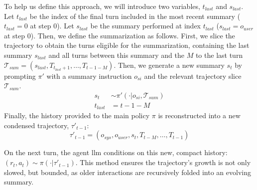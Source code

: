 \documentclass{article}
\begin{document}
To help us define this approach, we will introduce two variables, $t_{last}$ and $s_{last}$. Let $t_{last}$ be the index of the final turn included in the most recent summary ($t_{last}=0$ at step 0). Let $s_{last}$ be the summary performed at index $t_{last}$ ($s_{last}=o_{user}$ at step 0). Then, we define the summarization as follows. First, we slice the trajectory to obtain the turns eligible for the summarization, containing the last summary $s_{last}$ and all turns between this summary and the $M$ to the last turn $\mathcal{T}_{sum} = (s_{last}, T_{t_{last}+1}, \dots, T_{t-1-M})$. Then, we generate a new summary $s_t$ by prompting $\pi'$ with a summary instruction $o_{si}$ and the relevant trajectory slice $\mathcal{T}_{sum}$.
\begin{equation}
\begin{split}
s_{t} &\sim \pi'(\cdot|o_{si}, \mathcal{T}_{sum})\\
t_{last} &= t-1-M
\end{split}
\end{equation}
Finally, the history provided to the main policy $\pi$ is reconstructed into a new condensed trajectory, $\tau'_{t-1}$:
\begin{equation}
\label{eq:llm_summary_traj}
\tau'_{t-1} = (o_{sys}, o_{user}, s_t, T_{t-M}, \dots, T_{t-1})\end{equation}

On the next turn, the agent \ac{llm} conditions on this new, compact history: $(r_t, a_t) \sim \pi(\cdot|\tau'_{t-1})$. This method ensures the trajectory's growth is not only slowed, but bounded, as older interactions are recursively folded into an evolving summary.
\end{document}
